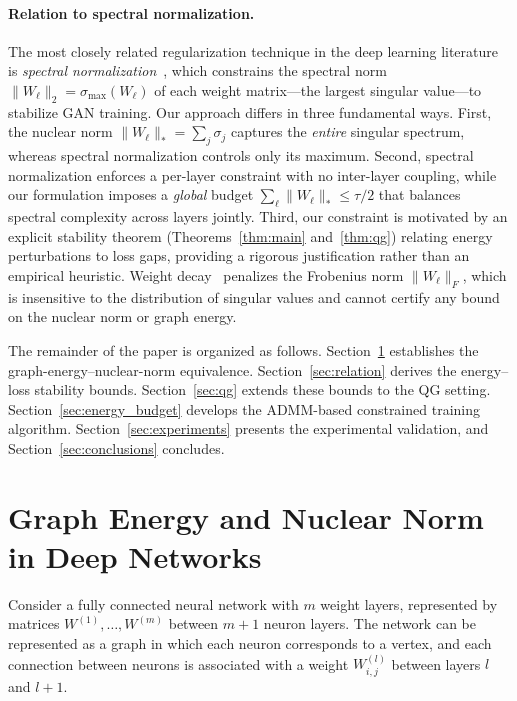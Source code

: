 \documentclass[a4paper,fleqn]{cas-sc}
\theoremstyle{remark}
\theoremstyle{definition}
\begin{document}
\paragraph{Relation to spectral normalization.}
The most closely related regularization technique in the deep learning literature is \emph{spectral normalization}~\cite{Miyato2018SpectralNorm}, which constrains the spectral norm $\|W_\ell\|_2=\sigma_{\max}(W_\ell)$ of each weight matrix---the largest singular value---to stabilize GAN training. Our approach differs in three fundamental ways. First, the nuclear norm $\|W_\ell\|_*=\sum_j\sigma_j$ captures the \emph{entire} singular spectrum, whereas spectral normalization controls only its maximum. Second, spectral normalization enforces a per-layer constraint with no inter-layer coupling, while our formulation imposes a \emph{global} budget $\sum_\ell\|W_\ell\|_*\le\tau/2$ that balances spectral complexity across layers jointly. Third, our constraint is motivated by an explicit stability theorem (Theorems~\ref{thm:main} and~\ref{thm:qg}) relating energy perturbations to loss gaps, providing a rigorous justification rather than an empirical heuristic. Weight decay~\cite{Krogh1991WeightDecay} penalizes the Frobenius norm $\|W_\ell\|_F$, which is insensitive to the distribution of singular values and cannot certify any bound on the nuclear norm or graph energy.

The remainder of the paper is organized as follows. Section~\ref{sec:graph_energy} establishes the graph-energy--nuclear-norm equivalence. Section~\ref{sec:relation} derives the energy--loss stability bounds. Section~\ref{sec:qg} extends these bounds to the QG setting. Section~\ref{sec:energy_budget} develops the ADMM-based constrained training algorithm. Section~\ref{sec:experiments} presents the experimental validation, and Section~\ref{sec:conclusions} concludes.

\section{Graph Energy and Nuclear Norm in Deep Networks}\label{sec:graph_energy}

Consider a fully connected neural network with $m$ weight layers, represented by matrices $W^{(1)},\dots,W^{(m)}$ between $m+1$ neuron layers.
 The network can be represented as a graph in which each neuron corresponds to a vertex, and each connection between neurons is associated with a weight $W_{i,j}^{(l)}$ between layers $l$ and $l+1$. 
\end{document}
